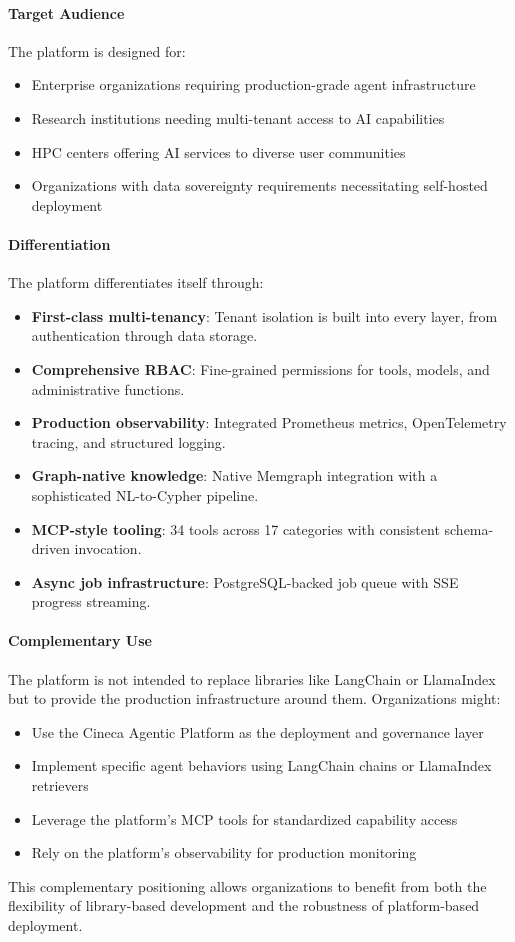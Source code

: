 \paragraph{Target Audience}
The platform is designed for:
\begin{itemize}
    \item Enterprise organizations requiring production-grade agent infrastructure
    \item Research institutions needing multi-tenant access to AI capabilities
    \item HPC centers offering AI services to diverse user communities
    \item Organizations with data sovereignty requirements necessitating self-hosted deployment
\end{itemize}

\paragraph{Differentiation}
The platform differentiates itself through:
\begin{itemize}
    \item \textbf{First-class multi-tenancy}: Tenant isolation is built into every layer, from authentication through data storage.
    \item \textbf{Comprehensive RBAC}: Fine-grained permissions for tools, models, and administrative functions.
    \item \textbf{Production observability}: Integrated Prometheus metrics, OpenTelemetry tracing, and structured logging.
    \item \textbf{Graph-native knowledge}: Native Memgraph integration with a sophisticated NL-to-Cypher pipeline.
    \item \textbf{MCP-style tooling}: 34 tools across 17 categories with consistent schema-driven invocation.
    \item \textbf{Async job infrastructure}: PostgreSQL-backed job queue with SSE progress streaming.
\end{itemize}

\paragraph{Complementary Use}
The platform is not intended to replace libraries like LangChain or LlamaIndex but to provide the production infrastructure around them. Organizations might:
\begin{itemize}
    \item Use the Cineca Agentic Platform as the deployment and governance layer
    \item Implement specific agent behaviors using LangChain chains or LlamaIndex retrievers
    \item Leverage the platform's MCP tools for standardized capability access
    \item Rely on the platform's observability for production monitoring
\end{itemize}

This complementary positioning allows organizations to benefit from both the flexibility of library-based development and the robustness of platform-based deployment.
